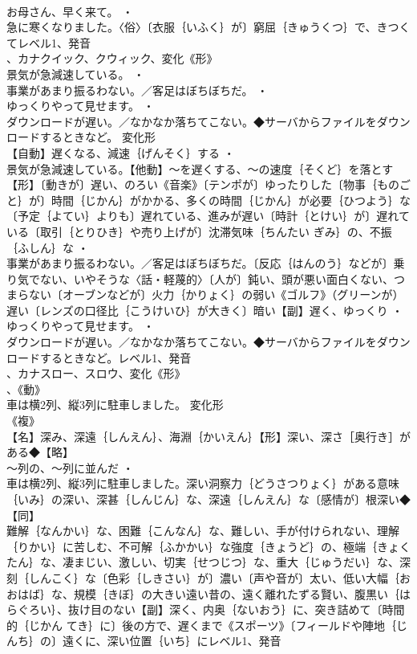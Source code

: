 \documentclass[8pt]{extreport}
\begin{document}
\begin{CJK}{UTF8}{min}
\\	お母さん、早く来て。 ・
\\	急に寒くなりました。〈俗〉〔衣服｛いふく｝が〕窮屈｛きゅうくつ｝で、きつくてレベル1、発音
\\	、カナクイック、クウィック、変化《形》
\\	景気が急減速している。 ・
\\	事業があまり振るわない。／客足はぼちぼちだ。 ・
\\	ゆっくりやって見せます。 ・
\\	ダウンロードが遅い。／なかなか落ちてこない。◆サーバからファイルをダウンロードするときなど。	変化形 
\\	【自動】遅くなる、減速｛げんそく｝する ・
\\	景気が急減速している。【他動】～を遅くする、～の速度｛そくど｝を落とす【形】〔動きが〕遅い、のろい《音楽》〔テンポが〕ゆったりした〔物事｛ものごと｝が〕時間｛じかん｝がかかる、多くの時間｛じかん｝が必要｛ひつよう｝な〔予定｛よてい｝よりも〕遅れている、進みが遅い〔時計｛とけい｝が〕遅れている〔取引｛とりひき｝や売り上げが〕沈滞気味｛ちんたい ぎみ｝の、不振｛ふしん｝な ・
\\	事業があまり振るわない。／客足はぼちぼちだ。〔反応｛はんのう｝などが〕乗り気でない、いやそうな〈話・軽蔑的〉〔人が〕鈍い、頭が悪い面白くない、つまらない〔オーブンなどが〕火力｛かりょく｝の弱い《ゴルフ》（グリーンが）遅い〔レンズの口径比｛こうけいひ｝が大きく〕暗い【副】遅く、ゆっくり ・
\\	ゆっくりやって見せます。 ・
\\	ダウンロードが遅い。／なかなか落ちてこない。◆サーバからファイルをダウンロードするときなど。レベル1、発音
\\	、カナスロー、スロウ、変化《形》
\\	、《動》
\\	車は横2列、縦3列に駐車しました。	変化形 
\\	《複》
\\	【名】深み、深遠｛しんえん｝、海淵｛かいえん｝【形】深い、深さ［奥行き］がある◆【略】
\\	～列の、～列に並んだ ・
\\	車は横2列、縦3列に駐車しました。深い洞察力｛どうさつりょく｝がある意味｛いみ｝の深い、深甚｛しんじん｝な、深遠｛しんえん｝な〔感情が〕根深い◆【同】
\\	難解｛なんかい｝な、困難｛こんなん｝な、難しい、手が付けられない、理解｛りかい｝に苦しむ、不可解｛ふかかい｝な強度｛きょうど｝の、極端｛きょくたん｝な、凄まじい、激しい、切実｛せつじつ｝な、重大｛じゅうだい｝な、深刻｛しんこく｝な〔色彩｛しきさい｝が〕濃い〔声や音が〕太い、低い大幅｛おおはば｝な、規模｛きぼ｝の大きい遠い昔の、遠く離れたずる賢い、腹黒い｛はらぐろい｝、抜け目のない【副】深く、内奥｛ないおう｝に、突き詰めて〔時間的｛じかん てき｝に〕後の方で、遅くまで《スポーツ》〔フィールドや陣地｛じんち｝の〕遠くに、深い位置｛いち｝にレベル1、発音

\end{CJK}
\end{document}
